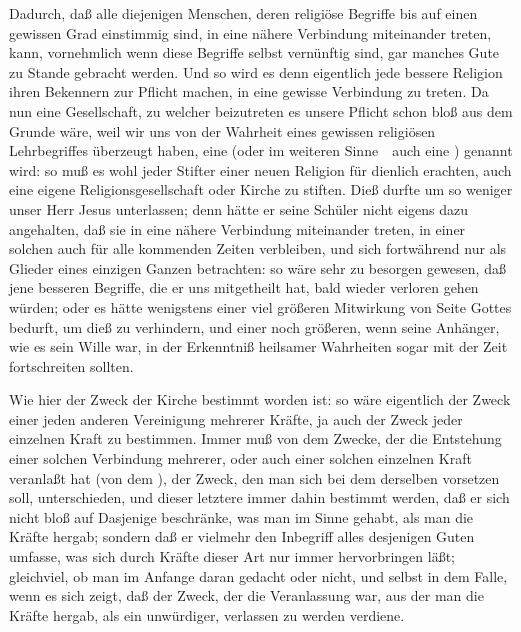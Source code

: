 \begin{aufza}
\item Dadurch, daß alle diejenigen Menschen, deren religiöse Begriffe bis auf einen gewissen Grad einstimmig sind, in eine nähere Verbindung miteinander treten, kann, vornehmlich wenn diese Begriffe selbst vernünftig sind, gar manches Gute zu Stande gebracht werden. Und so wird es denn eigentlich jede bessere Religion ihren Bekennern zur Pflicht machen, in eine gewisse Verbindung zu treten. Da nun eine Gesellschaft, zu welcher beizutreten es unsere Pflicht schon bloß aus dem Grunde wäre, weil wir uns von der Wahrheit eines gewissen religiösen Lehrbegriffes überzeugt haben, eine  (oder im weiteren Sinne~\ auch eine ) genannt wird: so muß es wohl jeder Stifter einer neuen Religion für dienlich erachten, auch eine eigene Religionsgesellschaft oder Kirche zu stiften. Dieß durfte um so weniger unser Herr Jesus unterlassen; denn hätte er seine Schüler nicht eigens dazu angehalten, daß sie in eine nähere Verbindung miteinander treten, in einer solchen auch für alle kommenden Zeiten verbleiben, und sich fortwährend nur als Glieder eines einzigen Ganzen betrachten: so wäre sehr zu besorgen gewesen, daß jene besseren Begriffe, die er uns mitgetheilt hat, bald wieder verloren gehen würden; oder es hätte wenigstens einer viel größeren Mitwirkung von Seite Gottes bedurft, um dieß zu verhindern, und einer noch größeren, wenn seine Anhänger, wie es sein Wille war, in der Erkenntniß heilsamer Wahrheiten sogar mit der Zeit fortschreiten sollten.
\item Wie hier der Zweck der Kirche bestimmt worden ist: so wäre eigentlich der Zweck einer jeden anderen Vereinigung mehrerer Kräfte, ja auch der Zweck jeder einzelnen Kraft zu bestimmen. Immer muß von dem Zwecke, der die Entstehung einer solchen Verbindung mehrerer, oder auch einer solchen einzelnen Kraft veranlaßt hat (von dem ), der Zweck, den man sich bei dem  derselben vorsetzen soll, unterschieden, und dieser letztere immer dahin bestimmt werden, daß er sich nicht bloß auf Dasjenige beschränke, was man im Sinne gehabt, als man die Kräfte hergab; sondern daß er vielmehr den Inbegriff alles desjenigen Guten umfasse, was sich durch Kräfte dieser Art nur immer hervorbringen läßt; gleichviel, ob man im Anfange daran gedacht oder nicht, und selbst in dem Falle, wenn es sich zeigt, daß der Zweck, der die Veranlassung war, aus der man die Kräfte hergab, als ein unwürdiger, verlassen zu werden verdiene.

\end{aufza}
